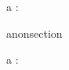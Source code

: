 \begin{zed}
a : \arithmos
\end{zed}
\begin{zsection}
\SECTION anonsection
\end{zsection}
\begin{zed}
a : \arithmos
\end{zed}
